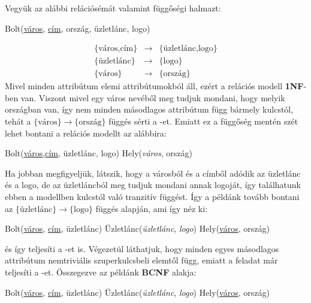 \begin{pld}
Vegyük az alábbi relációsémát valamint függőségi halmazt:
\begin{center}
    Bolt(\underline{város}, \underline{cím}, ország, üzletlánc, logo)
\end{center}
$$
    \begin{matrix}
    \{\text{város,cím}\} & \longrightarrow & \{\text{üzletlánc,logo}\} \\
    \{\text{üzletlánc}\} & \longrightarrow & \{\text{logo}\} \\
    \{\text{város}\}  & \longrightarrow & \{\text{ország}\}
    \end{matrix}
$$
Mivel minden attribútum elemi attribútumokból áll, ezért a relációs modell \textbf{1NF}-ben van. Viszont mivel egy város nevéből meg tudjuk mondani, hogy melyik országban van, így nem minden másodlagos attribútum függ bármely kulcstól, tehát a $\{\text{város}\} \rightarrow \{\text{ország}\}$ függés sérti a \nfk-et. Emiatt ez a függőség mentén szét lehet bontani a relációs modellt az alábbira:
\begin{center}
    Bolt(\underline{város},\underline{cím}, üzletlánc, logo) \break
    Hely(\textit{város}, ország)
\end{center}
Ha jobban megfigyeljük, látszik, hogy a városból és a címből adódik az üzletlánc és a logo, de az üzletláncból meg tudjuk mondani annak logoját, így találhatunk ebben a modellben kulcstól való tranzitív függést. Így a példánk tovább bontani az $\{\text{üzletlánc}\} \rightarrow \{\text{logo}\}$ függés alapján, ami így néz ki:
\begin{center}
    Bolt(\underline{város}, \underline{cím}, üzletlánc) \break
    Üzletlánc(\textit{üzletlánc}, \textit{logo})\break
    Hely(\underline{város}, ország)
\end{center}
és így teljesíti a \nfh-et is. Végezetül láthatjuk, hogy minden egyes másodlagos attribútum nemtriviális szuperkulcsbeli elemtől függ, emiatt a feladat már teljesíti a \BCNF-et.\hfill \break
Összegezve az példánk \textbf{BCNF} alakja:
\begin{center}
    Bolt(\underline{város}, \underline{cím}, üzletlánc) \break
    Üzletlánc(\textit{üzletlánc}, \textit{logo})\break
    Hely(\underline{város}, ország)
\end{center}
\end{pld}
